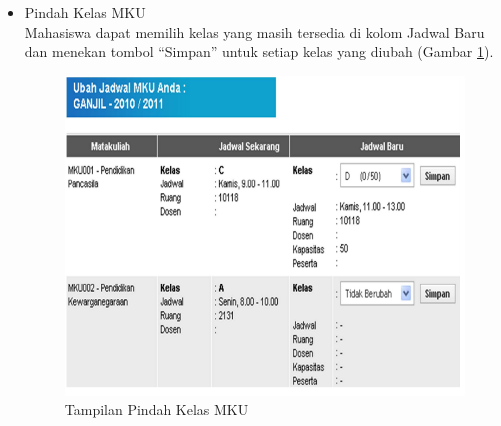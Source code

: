\begin{enumerate}
\begin{itemize}
\begin{itemize}
			\item Pindah Kelas MKU \\
			Mahasiswa dapat memilih kelas yang masih tersedia di kolom Jadwal Baru dan menekan tombol ``Simpan'' untuk setiap kelas yang diubah (Gambar \ref{fig:3_pam_utama_pindahmku}). 
			\begin{figure}[H]
				\centering
				\includegraphics[scale=0.5]{Gambar/pam-utama-pindahmku}
				\caption{Tampilan Pindah Kelas MKU\cite{BTI:2012}} 
				\label{fig:3_pam_utama_pindahmku}
			\end{figure}

		\end{itemize}
		

\end{itemize}
\end{enumerate}
